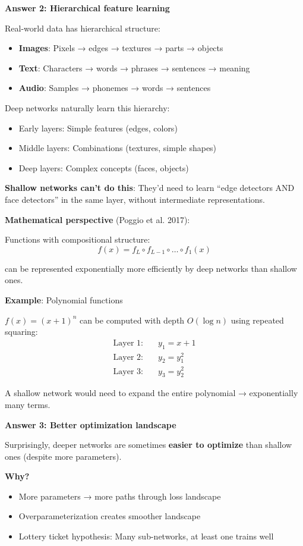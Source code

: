 \textbf{Answer 2: Hierarchical feature learning}

Real-world data has hierarchical structure:
\begin{itemize}
\item \textbf{Images}: Pixels → edges → textures → parts → objects
\item \textbf{Text}: Characters → words → phrases → sentences → meaning
\item \textbf{Audio}: Samples → phonemes → words → sentences
\end{itemize}

Deep networks naturally learn this hierarchy:
\begin{itemize}
\item Early layers: Simple features (edges, colors)
\item Middle layers: Combinations (textures, simple shapes)
\item Deep layers: Complex concepts (faces, objects)
\end{itemize}

\textbf{Shallow networks can't do this}: They'd need to learn ``edge detectors AND face detectors'' in the same layer, without intermediate representations.

\textbf{Mathematical perspective} (Poggio et al. 2017):

Functions with compositional structure:
\[
f(x) = f_L \circ f_{L-1} \circ \ldots \circ f_1(x)
\]

can be represented exponentially more efficiently by deep networks than shallow ones.

\textbf{Example}: Polynomial functions

$f(x) = (x + 1)^n$ can be computed with depth $O(\log n)$ using repeated squaring:
\begin{align*}
\text{Layer 1:} \quad & y_1 = x + 1 \\
\text{Layer 2:} \quad & y_2 = y_1^2 \\
\text{Layer 3:} \quad & y_3 = y_2^2
\end{align*}

A shallow network would need to expand the entire polynomial → exponentially many terms.

\textbf{Answer 3: Better optimization landscape}

Surprisingly, deeper networks are sometimes \textbf{easier to optimize} than shallow ones (despite more parameters).

\textbf{Why?}
\begin{itemize}
\item More parameters → more paths through loss landscape
\item Overparameterization creates smoother landscape
\item Lottery ticket hypothesis: Many sub-networks, at least one trains well
\end{itemize}


